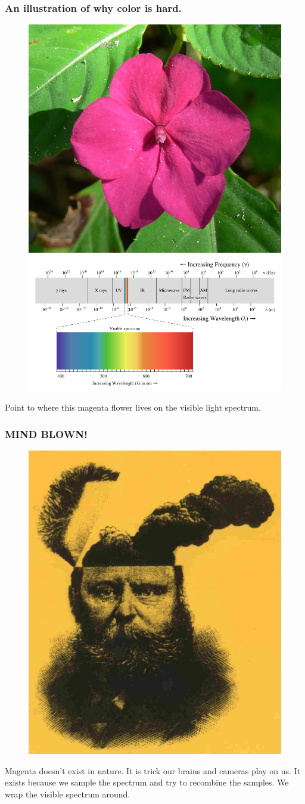 \documentclass{beamer}
\begin{document}
\begin{frame}
\frametitle{An illustration of why color is hard.}
 \begin{figure}
     \includegraphics[width=0.3\linewidth]{flower.jpg}%
     \quad
     \includegraphics[width=0.5\linewidth]{visiblelight.png}%
 \end{figure}
Point to where this magenta flower lives on the visible light spectrum.
\end{frame}
\begin{frame}
\frametitle{MIND BLOWN!}
 \begin{figure}
     \includegraphics[width=0.3\linewidth]{mindblown.jpg}
 \end{figure}
Magenta doesn't exist in nature. It is trick our brains and cameras
play on us. It exists because we sample the spectrum and try to
recombine the samples. We wrap the visible spectrum around. 
\end{frame}
\end{document}

